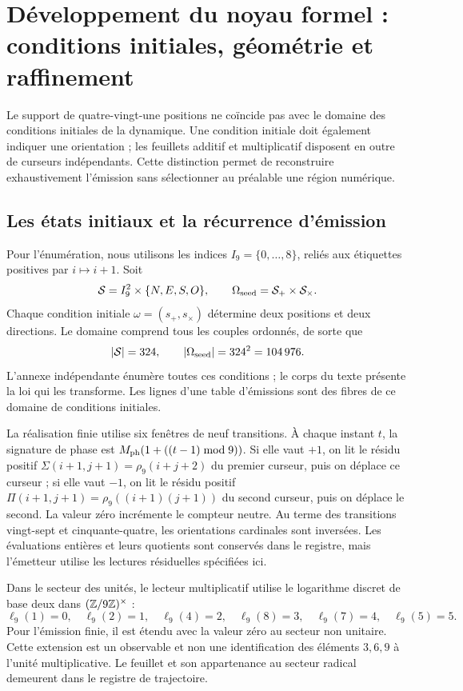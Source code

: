 \section{Développement du noyau formel : conditions initiales, géométrie et raffinement}
\label{sec:extension}

Le support de quatre-vingt-une positions ne coïncide pas avec le domaine des conditions initiales de la dynamique. Une condition initiale doit également indiquer une orientation ; les feuillets additif et multiplicatif disposent en outre de curseurs indépendants. Cette distinction permet de reconstruire exhaustivement l’émission sans sélectionner au préalable une région numérique.

\subsection{Les états initiaux et la récurrence d’émission}

Pour l’énumération, nous utilisons les indices \(I_9=\{0,\ldots,8\}\), reliés aux étiquettes positives par \(i\mapsto i+1\). Soit
\[
 \mathcal S=I_9^2\times\{N,E,S,O\},\qquad
 \Omega_{\rm seed}=\mathcal S_+\times\mathcal S_\times.
\]
Chaque condition initiale \(\omega=(s_+,s_\times)\) détermine deux positions et deux directions. Le domaine comprend tous les couples ordonnés, de sorte que
\begin{equation}
 |\mathcal S|=324,\qquad |\Omega_{\rm seed}|=324^2=104\,976.
 \label{eq:semillas}
\end{equation}
L’annexe indépendante énumère toutes ces conditions ; le corps du texte présente la loi qui les transforme. Les lignes d’une table d’émissions sont des fibres de ce domaine de conditions initiales.

La réalisation finie utilise six fenêtres de neuf transitions. À chaque instant \(t\), la signature de phase est \(M_{\rm ph}(1+((t-1)\bmod9))\). Si elle vaut \(+1\), on lit le résidu positif \(\Sigma(i+1,j+1)=\rho_9(i+j+2)\) du premier curseur, puis on déplace ce curseur ; si elle vaut \(-1\), on lit le résidu positif \(\Pi(i+1,j+1)=\rho_9((i+1)(j+1))\) du second curseur, puis on déplace le second. La valeur zéro incrémente le compteur neutre. Au terme des transitions vingt-sept et cinquante-quatre, les orientations cardinales sont inversées. Les évaluations entières et leurs quotients sont conservés dans le registre, mais l’émetteur utilise les lectures résiduelles spécifiées ici.

Dans le secteur des unités, le lecteur multiplicatif utilise le logarithme discret de base deux dans \((\mathbb Z/9\mathbb Z)^\times\) :
\[
 \ell_9(1)=0,\quad\ell_9(2)=1,\quad\ell_9(4)=2,\quad
 \ell_9(8)=3,\quad\ell_9(7)=4,\quad\ell_9(5)=5.
\]
Pour l’émission finie, il est étendu avec la valeur zéro au secteur non unitaire. Cette extension est un observable et non une identification des éléments \(3,6,9\) à l’unité multiplicative. Le feuillet et son appartenance au secteur radical demeurent dans le registre de trajectoire.

